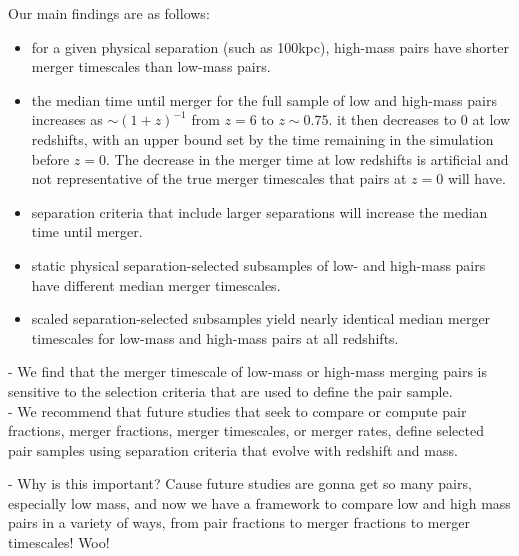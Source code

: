 \documentclass[twocolumn,linenumbers]{aastex631}
\begin{document}
    Our main findings are as follows: 
    \begin{itemize}
        \item for a given physical separation (such as 100kpc), high-mass pairs have shorter merger timescales than low-mass pairs. 
        \item the median time until merger for the full sample of low and high-mass pairs increases as $\sim(1+z)^{-1}$ from $z=6$ to $z\sim0.75$. it then decreases to 0 at low redshifts, with an upper bound set by the time remaining in the simulation before $z=0$. The decrease in the merger time at low redshifts is artificial and not representative of the true merger timescales that pairs at $z=0$ will have.
        \item separation criteria that include larger separations will increase the median time until merger.
        \item static physical separation-selected subsamples of low- and high-mass pairs have different median merger timescales.
        \item scaled separation-selected subsamples yield nearly identical median merger timescales for low-mass and high-mass pairs at all redshifts. 
    \end{itemize}
    
    - We find that the merger timescale of low-mass or high-mass merging pairs is sensitive to the selection criteria that are used to define the pair sample.\\
    
    - We recommend that future studies that seek to compare or compute pair fractions, merger fractions, merger timescales, or merger rates, define selected pair samples using separation criteria that evolve with redshift and mass. 
    
    - Why is this important? Cause future studies are gonna get so many pairs, especially low mass, and now we have a framework to compare low and high mass pairs in a variety of ways, from pair fractions to merger fractions to merger timescales! Woo!
    
    










{}

\end{document}
